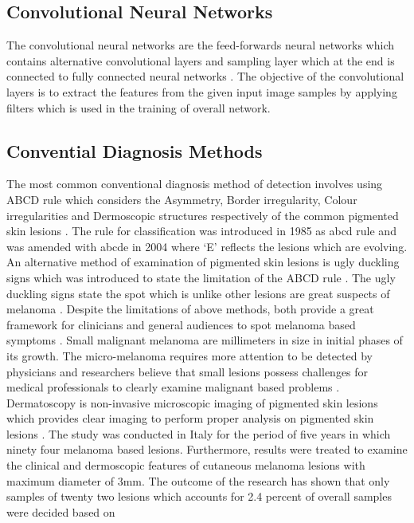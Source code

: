 \subsection{Convolutional Neural Networks}
The convolutional neural networks are the feed-forwards neural 
networks which contains alternative convolutional layers and sampling 
layer which at the end is connected to fully connected neural networks \citep{liew2016gender}.
The objective of the convolutional layers is to extract the features from 
the given input image samples by applying filters which is used in the training 
of overall network.

\pagebreak
\subsection{Convential Diagnosis Methods}
The most common conventional diagnosis method of detection involves
using ABCD rule which considers the Asymmetry, Border irregularity,
Colour irregularities and  Dermoscopic structures respectively of the
common pigmented skin lesions \citep{LOESCHER2013170}. 
The rule for classification was introduced in 1985 as abcd 
rule and was amended with abcde in 2004 where ‘E’ reflects the 
lesions which are evolving. An alternative method of examination of
pigmented skin lesions is  ugly duckling signs which was introduced 
to state the limitation of the ABCD rule \citep{DanielJensen2015}.
The ugly duckling signs state the spot which is unlike other 
lesions are great suspects of melanoma \citep{grob1998ugly}.
Despite the limitations of above methods, both provide a great
framework for clinicians and general audiences to spot melanoma 
based symptoms \citep{DanielJensen2015}.
Small malignant melanoma are millimeters in size in initial phases
of its growth.  
The micro-melanoma requires more attention to be
detected by physicians and researchers believe that small 
lesions possess challenges for medical professionals to 
clearly examine malignant based problems \citep{doi:10.1177/030089160409000125}.
Dermatoscopy is non-invasive microscopic imaging of pigmented skin 
lesions which provides clear imaging to perform proper analysis on 
pigmented skin lesions \citep{LOESCHER2013170}. 
The study was conducted in Italy for the period of five years in 
which ninety four melanoma based lesions. Furthermore, results 
were treated to examine the clinical and dermoscopic features of 
cutaneous melanoma lesions with maximum diameter of 3mm. 
The outcome of the research has shown that only samples of twenty two lesions which 
accounts for 2.4 percent of overall samples were decided based on
